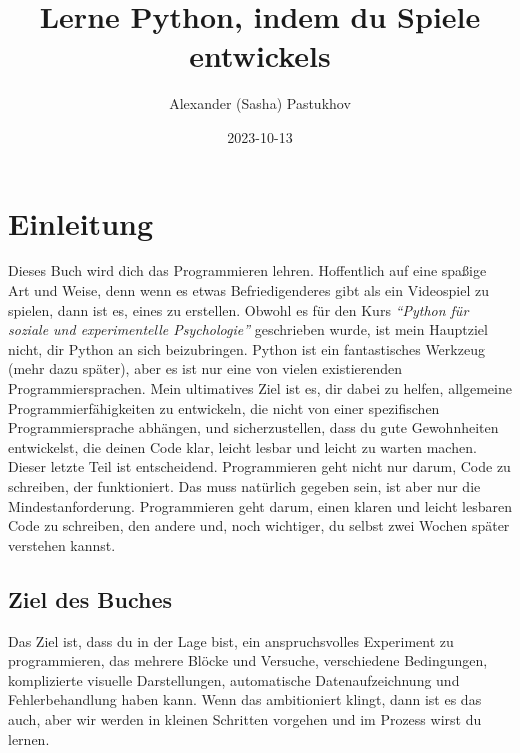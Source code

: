 \documentclass[
]{book}
\title{Lerne Python, indem du Spiele entwickels}
\author{Alexander (Sasha) Pastukhov}
\date{2023-10-13}
\begin{document}
\maketitle

{
\setcounter{tocdepth}{1}
\tableofcontents
}
\hypertarget{intro}{%
\chapter{Einleitung}\label{intro}}

Dieses Buch wird dich das Programmieren lehren. Hoffentlich auf eine spaßige Art und Weise, denn wenn es etwas Befriedigenderes gibt als ein Videospiel zu spielen, dann ist es, eines zu erstellen. Obwohl es für den Kurs \emph{``Python für soziale und experimentelle Psychologie''} geschrieben wurde, ist mein Hauptziel nicht, dir Python an sich beizubringen. Python ist ein fantastisches Werkzeug (mehr dazu später), aber es ist nur eine von vielen existierenden Programmiersprachen. Mein ultimatives Ziel ist es, dir dabei zu helfen, allgemeine Programmierfähigkeiten zu entwickeln, die nicht von einer spezifischen Programmiersprache abhängen, und sicherzustellen, dass du gute Gewohnheiten entwickelst, die deinen Code klar, leicht lesbar und leicht zu warten machen. Dieser letzte Teil ist entscheidend. Programmieren geht nicht nur darum, Code zu schreiben, der funktioniert. Das muss natürlich gegeben sein, ist aber nur die Mindestanforderung. Programmieren geht darum, einen klaren und leicht lesbaren Code zu schreiben, den andere und, noch wichtiger, du selbst zwei Wochen später verstehen kannst.

\hypertarget{ziel-des-buches}{%
\section{Ziel des Buches}\label{ziel-des-buches}}

Das Ziel ist, dass du in der Lage bist, ein anspruchsvolles Experiment zu programmieren, das mehrere Blöcke und Versuche, verschiedene Bedingungen, komplizierte visuelle Darstellungen, automatische Datenaufzeichnung und Fehlerbehandlung haben kann. Wenn das ambitioniert klingt, dann ist es das auch, aber wir werden in kleinen Schritten vorgehen und im Prozess wirst du lernen.
\end{document}
